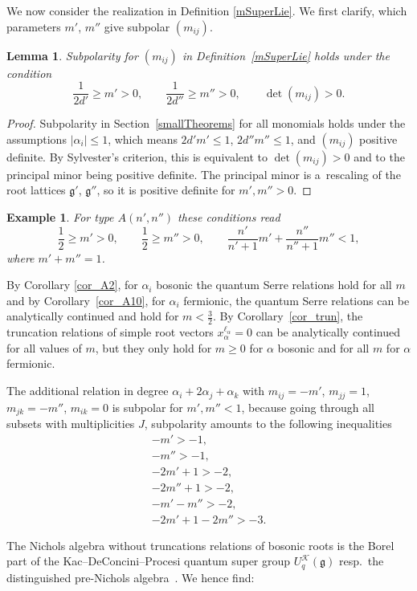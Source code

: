 \documentclass[10pt,a4paper]{amsart}
\numberwithin{equation}{section}
\newtheorem{lem}[teo]{Lemma}
\newtheorem{ese}[teo]{Example}
\newcommand{\g}{\mathfrak{g}}
\begin{document}
 We now consider the realization in Definition \ref{mSuperLie}. We first clarify, which parameters $m'$, $m''$ give subpolar $(m_{ij})$.
 \begin{lem}
 	Subpolarity for $(m_{ij})$ in Definition~{\rm \ref{mSuperLie}} holds under the condition
 \[\frac{1}{2d'}\geq m'>0,\qquad \frac{1}{2d''}\geq m''>0,\qquad \det (m_{ij})>0.\]
 \end{lem}
 \begin{proof}
 	Subpolarity in Section~\ref{smallTheorems} for all monomials holds under the assumptions $|\alpha_i|\leq 1$, which means $2d'm'\leq 1$, $2d''m''\leq 1$, and $(m_{ij})$ positive definite. By Sylvester's criterion, this is equivalent to $\det (m_{ij})>0$ and to the principal minor being positive definite. The principal minor is a~rescaling of the root lattices $\g'$, $\g''$, so it is positive definite for $m',m''>0$.
 \end{proof}

 \begin{ese}For type $A(n',n'')$ these conditions read
 \[\frac{1}{2}\geq m'>0,\qquad \frac{1}{2}\geq m''>0,\qquad \frac{n'}{n'+1}m'+\frac{n''}{n''+1}m''<1,\]
 where $m'+m''=1$.
 \end{ese}

By Corollary \ref{cor_A2}, for $\alpha_i$ bosonic the quantum Serre relations hold for all $m$ and by Corollary~\ref{cor_A10}, for $\alpha_i$ fermionic, the quantum Serre relations can be analytically continued and hold for $m<\frac{3}{2}$. By Corollary~\ref{cor_trun}, the truncation relations of simple root vectors $x_\alpha^{\ell_\alpha}=0$ can be analytically continued for all values of $m$, but they only hold for $m\geq 0$ for $\alpha$ bosonic and for all $m$ for $\alpha$ fermionic.

 The additional relation in degree $\alpha_i+2\alpha_j+\alpha_k$ with $m_{ij}=-m'$, $m_{jj}=1$, $m_{jk}=-m''$, $m_{ik}=0$ is subpolar for $m',m''<1$, because going through all subsets with multiplicities $J$, subpolarity amounts to the following inequalities
 \begin{gather*}
 -m'>-1,\\
 -m''>-1,\\
 -2m'+1>-2,\\
 -2m''+1>-2,\\
 -m'-m''>-2,\\
 -2m'+1-2m''>-3.
 \end{gather*}

The Nichols algebra without truncations relations of bosonic roots is the Borel part of the Kac--DeConcini--Procesi quantum super group $U_q^\mathcal{K}(\g)$ resp.~the distinguished pre-Nichols algebra~\cite{Ang16}. We hence find:
\end{document}

